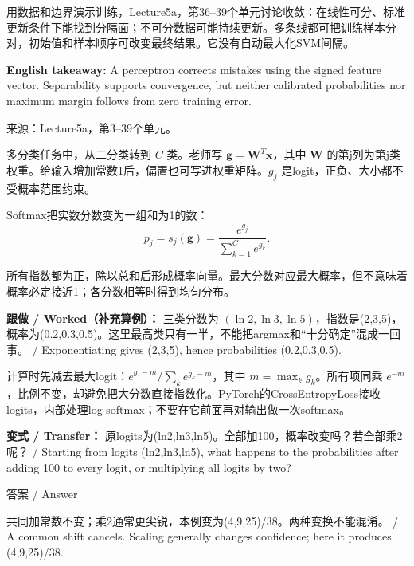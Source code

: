 用数据和边界演示训练，Lecture5a，第36–39个单元讨论收敛：在线性可分、标准更新条件下能找到分隔面；不可分数据可能持续更新。多条线都可把训练样本分对，初始值和样本顺序可改变最终结果。它没有自动最大化SVM间隔。


\textbf{English takeaway:} A perceptron corrects mistakes using the signed feature vector. Separability supports convergence, but neither calibrated probabilities nor maximum margin follows from zero training error.


来源：Lecture5a，第3–39个单元。








多分类任务中，从二分类转到 \(C\) 类。老师写 \(\mathbf g=\mathbf W^T\mathbf x\)，其中 \(\mathbf W\) 的第j列为第j类权重。给输入增加常数1后，偏置也可写进权重矩阵。\(g_j\) 是logit，正负、大小都不受概率范围约束。


Softmax把实数分数变为一组和为1的数：
\[
p_j=s_j(\mathbf g)=\frac{e^{g_j}}{\sum_{k=1}^{C}e^{g_k}}.\tag{5.2}
\]


所有指数都为正，除以总和后形成概率向量。最大分数对应最大概率，但不意味着概率必定接近1；各分数相等时得到均匀分布。


\textbf{跟做 / Worked（补充算例）：} 三类分数为 \((\ln2,\ln3,\ln5)\)，指数是(2,3,5)，概率为(0.2,0.3,0.5)。这里最高类只有一半，不能把argmax和“十分确定”混成一回事。 / Exponentiating gives (2,3,5), hence probabilities (0.2,0.3,0.5).






计算时先减去最大logit：\(e^{g_j-m}/\sum_ke^{g_k-m}\)，其中 \(m=\max_k g_k\)。所有项同乘 \(e^{-m}\)，比例不变，却避免把大分数直接指数化。PyTorch的CrossEntropyLoss接收logits，内部处理log-softmax；不要在它前面再对输出做一次softmax。


\textbf{变式 / Transfer：} 原logits为(ln2,ln3,ln5)。全部加100，概率改变吗？若全部乘2呢？ / Starting from logits (ln2,ln3,ln5), what happens to the probabilities after adding 100 to every logit, or multiplying all logits by two?



\begin{StudySolution}{答案 / Answer}


共同加常数不变；乘2通常更尖锐，本例变为(4,9,25)/38。两种变换不能混淆。 / A common shift cancels. Scaling generally changes confidence; here it produces (4,9,25)/38.


\end{StudySolution}


